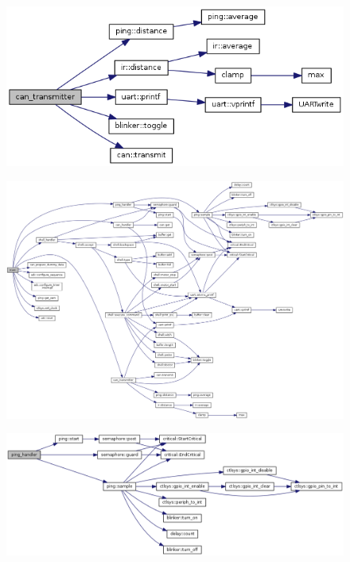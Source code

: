\documentclass[12pt]{article}
\begin{document}
\begin{figure}[H]
  \includegraphics[width=\textwidth]{./img/sensor_can_transmitter.png}
\end{figure}

\begin{figure}[H]
  \includegraphics[width=\textwidth]{./img/sense_main.png}
\end{figure}

\begin{figure}[H]
  \includegraphics[width=\textwidth]{./img/ping_handler.png}
\end{figure}
\end{document}
